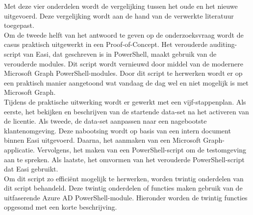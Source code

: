 Met deze vier onderdelen wordt de vergelijking tussen het oude en het nieuwe uitgevoerd. Deze vergelijking wordt aan de hand van de verwerkte literatuur toegepast. \\

Om de tweede helft van het antwoord te geven op de onderzoeksvraag wordt de casus praktisch uitgewerkt in een Proof-of-Concept. Het verouderde auditing-script van Easi, dat geschreven is in PowerShell, maakt gebruik van de verouderde modules. Dit script wordt vernieuwd door middel van de modernere Microsoft Graph PowerShell-modules. Door dit script te herwerken wordt er op een praktisch manier aangetoond wat vandaag de dag wel en niet mogelijk is met Microsoft Graph. \\

Tijdens de praktische uitwerking wordt er gewerkt met een vijf-stappenplan. Als eerste, het bekijken en beschrijven van de startende data-set na het activeren van de licentie. Als tweede, de data-set aanpassen naar een nagebootste klantenomgeving. Deze nabootsing wordt op basis van een intern document binnen Easi uitgevoerd. Daarna, het aanmaken van een Microsoft Graph-applicatie. Vervolgens, het maken van een PowerShell-script om de testomgeving aan te spreken. Als laatste, het omvormen van het verouderde PowerShell-script dat Easi gebruikt. \\

Om dit script zo efficiënt mogelijk te herwerken, worden twintig onderdelen van dit script behandeld. Deze twintig onderdelen of functies maken gebruik van de uitfaserende Azure \ac{AD} PowerShell-module. Hieronder worden de twintig functies opgesomd met een korte beschrijving. 

